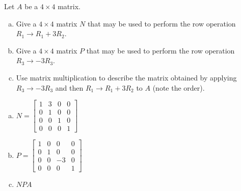 
\begin{exerciseStatement}


Let \(A\) be a \(4 \times 4\) matrix.


\begin{enumerate}[(a)]
\item Give a \(4 \times 4\) matrix \(N\) that may be used to perform the row operation \( R_1 \to R_1 + 3R_2 \).
\item Give a \(4 \times 4\) matrix \(P\) that may be used to perform the row operation \( R_3 \to -3R_3 \).
\item Use matrix multiplication to describe the matrix obtained by applying \( R_3 \to -3R_3 \) and then \( R_1 \to R_1 + 3R_2 \) to \(A\) (note the order). 
\end{enumerate}
    
\end{exerciseStatement}
    
\begin{exerciseAnswer} 

\begin{enumerate}[(a)]
\item \(N= \left[\begin{array}{cccc}
1 & 3 & 0 & 0 \\
0 & 1 & 0 & 0 \\
0 & 0 & 1 & 0 \\
0 & 0 & 0 & 1
\end{array}\right] \)
\item \(P= \left[\begin{array}{cccc}
1 & 0 & 0 & 0 \\
0 & 1 & 0 & 0 \\
0 & 0 & -3 & 0 \\
0 & 0 & 0 & 1
\end{array}\right] \)
\item \(NPA\)
\end{enumerate}
    
\end{exerciseAnswer}
    
